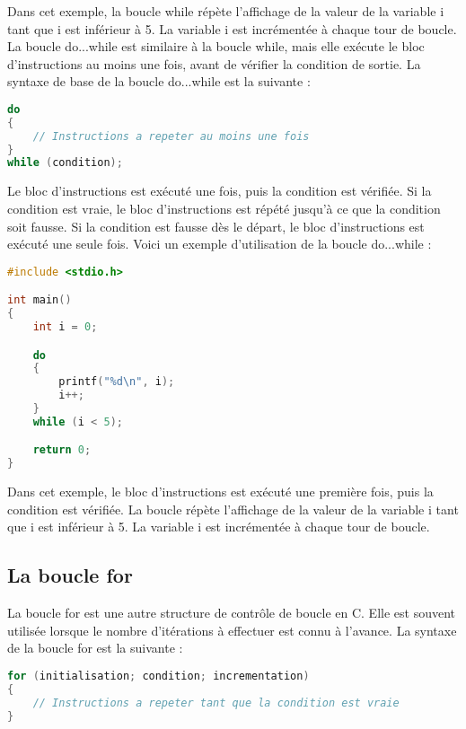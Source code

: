 \documentclass{uofa-eng-assignment}
\begin{document}
\noindent \newline
Dans cet exemple, la boucle while répète l'affichage de la valeur de la variable i tant que i est inférieur à 5. La variable i est incrémentée à chaque tour de boucle.
\newline \newline
La boucle do...while est similaire à la boucle while, mais elle exécute le bloc d'instructions au moins une fois, avant de vérifier la condition de sortie. La syntaxe de base de la boucle do...while est la suivante :

\begin{lstlisting}[language=c]
do
{
    // Instructions a repeter au moins une fois
}
while (condition);
\end{lstlisting}

\noindent \newline
Le bloc d'instructions est exécuté une fois, puis la condition est vérifiée. Si la condition est vraie, le bloc d'instructions est répété jusqu'à ce que la condition soit fausse. Si la condition est fausse dès le départ, le bloc d'instructions est exécuté une seule fois.
\newline \newline
Voici un exemple d'utilisation de la boucle do...while :

\begin{lstlisting}[language=c]
    #include <stdio.h>

int main()
{
    int i = 0;

    do
    {
        printf("%d\n", i);
        i++;
    }
    while (i < 5);

    return 0;
}
\end{lstlisting}

\noindent \newline
Dans cet exemple, le bloc d'instructions est exécuté une première fois, puis la condition est vérifiée. La boucle répète l'affichage de la valeur de la variable i tant que i est inférieur à 5. La variable i est incrémentée à chaque tour de boucle.

\subsection{La boucle for}
La boucle for est une autre structure de contrôle de boucle en C. Elle est souvent utilisée lorsque le nombre d'itérations à effectuer est connu à l'avance.
\newline \newline
La syntaxe de la boucle for est la suivante :
\begin{lstlisting}[language=c]
for (initialisation; condition; incrementation)
{
    // Instructions a repeter tant que la condition est vraie
}
\end{lstlisting}
\end{document}
